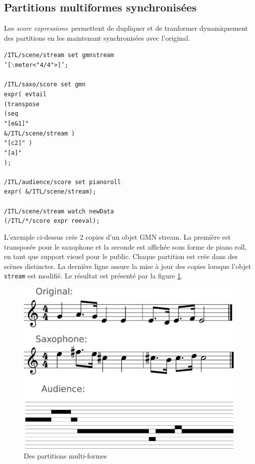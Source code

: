 \documentclass{article}
\newcommand{\OSC}[1]{\texttt{#1}}
\newcommand{\sExprs}{\emph{score expressions}}
\newcommand{\tab}{\hspace*{4mm}}
\newcommand{\sample}	[1]			{\vspace{-0.2em}\begin{center}\colorbox{mygrey}{\begin{minipage}[t]{0.97\columnwidth} {\small \texttt{#1}}\end{minipage}}\end{center}}
\begin{document}
\subsection{Partitions multiformes synchronisées}
\label{sample2}

Les \sExprs\ permettent de dupliquer et de tranformer dynamiquement des partitions en les maintenant synchronisées avec l'original.

\sample{/ITL/scene/stream set gmnstream \\
\tab '[$\backslash$meter<"4/4">]';\\
\\
/ITL/saxo/score set gmn \\
\tab expr( evtail\\
\tab \tab (transpose\\
\tab \tab \tab (seq\\
\tab \tab \tab \tab "[e\&1]"\\
\tab \tab \tab \tab \&/ITL/scene/stream )\\
\tab \tab \tab "[c2]" )\\
\tab \tab "[a]"\\
\tab );\\
\\
/ITL/audience/score set pianoroll \\
\tab expr( \&/ITL/scene/stream);\\
\\
/ITL/scene/stream watch newData\\
\tab(/ITL/*/score expr reeval);
}
L'exemple ci-dessus crée 2 copies d'un objet GMN stream. La première est transposée pour le saxophone et la seconde est affichée sous forme de piano roll, en tant que support visuel pour le public. Chaque partition est crée dans des scènes distinctes. La dernière ligne assure la mise à jour des copies lorsque l'objet \OSC{stream} est modifié. Le résultat est présenté par la figure \ref{fig:mutliscoreFig}.

\begin{figure}[th]
\centering
\includegraphics[width=0.9\columnwidth]{imgs/example1}
\caption{Des partitions multi-formes
\label{fig:mutliscoreFig}}
\end{figure}
\end{document}
